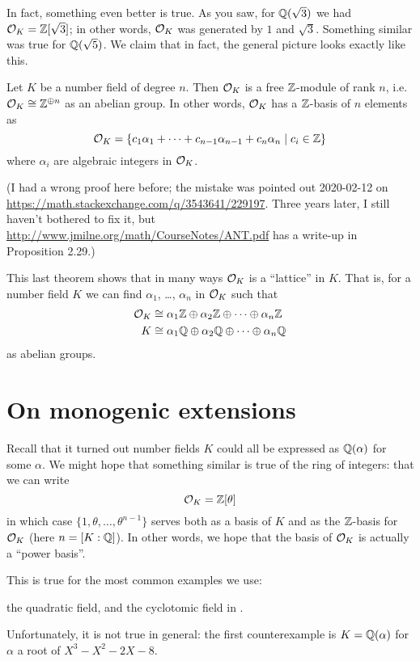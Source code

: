 In fact, something even better is true.
As you saw, for $\mathbb Q(\sqrt 3)$ we had $\mathcal O_K = \mathbb Z[\sqrt 3]$;
in other words, $\mathcal O_K$ was generated by $1$ and $\sqrt 3$.
Something similar was true for $\mathbb Q(\sqrt 5)$.
We claim that in fact, the general picture looks exactly like this.

\begin{theorem}
	Let $K$ be a number field of degree $n$.
	Then $\mathcal O_K$ is a free $\mathbb Z$-module of rank $n$,
	i.e.\ $\mathcal O_K \cong \mathbb Z^{\oplus n}$ as an abelian group.
	In other words, $\mathcal O_K$ has a $\mathbb Z$-basis of $n$ elements as
	\[ \mathcal O_K = \left\{ c_1\alpha_1 + \dots
			+ c_{n-1}\alpha_{n-1} + c_n\alpha_n \mid c_i \in \mathbb Z \right\} \]
	where $\alpha_i$ are algebraic integers in $\mathcal O_K$.
	\label{thm:OK_free_Z_module}
\end{theorem}

(I had a wrong proof here before; the mistake was pointed out 2020-02-12 on
\url{https://math.stackexchange.com/q/3543641/229197}.
Three years later, I still haven't bothered to fix it,
but \url{http://www.jmilne.org/math/CourseNotes/ANT.pdf}
has a write-up in Proposition 2.29.)

This last theorem shows that in many ways $\mathcal O_K$ is a ``lattice'' in $K$.
That is, for a number field $K$ we can find $\alpha_1$, \dots, $\alpha_n$
in $\mathcal O_K$ such that
\begin{align*}
	\mathcal O_K &\cong \alpha_1\mathbb Z \oplus \alpha_2\mathbb Z \oplus \dots \oplus \alpha_n\mathbb Z \\
	K &\cong \alpha_1\mathbb Q \oplus \alpha_2\mathbb Q \oplus \dots \oplus \alpha_n\mathbb Q
\end{align*}
as abelian groups.

\section{On monogenic extensions}
Recall that it turned out number fields $K$ could all be
expressed as $\mathbb Q(\alpha)$ for some $\alpha$.
We might hope that something similar is true of the ring of integers:
that we can write \[ \mathcal O_K = \mathbb Z[\theta] \]
in which case $\{1, \theta, \dots, \theta^{n-1}\}$
serves both as a basis of $K$ and as the $\mathbb Z$-basis for $\mathcal O_K$ (here $n = [K:\mathbb Q]$).
In other words, we hope that the basis of $\mathcal O_K$ is actually a ``power basis''.

This is true for the most common examples we use:
\begin{itemize}
	\ii the quadratic field, and
	\ii the cyclotomic field in .
\end{itemize}
Unfortunately, it is not true in general:
the first counterexample is $K=\mathbb Q(\alpha)$ for $\alpha$ a root of $X^3-X^2-2X-8$.

